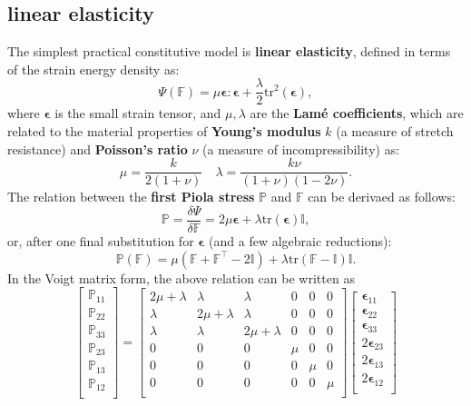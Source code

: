 \documentclass[11pt]{amsart}
\numberwithin{figure}{section}
\theoremstyle{plain}
\theoremstyle{definition}
\numberwithin{equation}{section}
\begin{document}
\subsection{linear elasticity}
The simplest practical constitutive model is \textbf{linear elasticity}, 
defined in terms of the strain energy density as: 
\[
  \Psi \left(\mathbb{F}\right) = 
  \mu \bm{\epsilon} : \bm{\epsilon} 
  + \frac{ \lambda }{ 2 } \text{tr} ^{2} \left(\bm{\epsilon}\right),
\] 
where $\bm{\epsilon}$ is the small strain tensor, 
and $\mu, \lambda$ are the \textbf{Lam\'e coefficients}, 
which are related to the material properties of  \textbf{Young's modulus} $k$ (a measure of stretch resistance) and \textbf{Poisson's ratio} $\nu$ (a measure of incompressibility) as:
\[
\mu = \frac{ k }{ 2 \left(1+\nu\right) } \quad 
\lambda = \frac{ k \nu }{ \left(1+\nu\right) \left(1 - 2\nu\right) } .
\] 
The relation between the  \textbf{first Piola stress} $\mathbb{P}$ and $\mathbb{F}$ can be derivaed as follows:
\[
  \mathbb{P} = \frac{ \delta \Psi }{ \delta \mathbb{F} }  = 
  2 \mu \bm{\epsilon} + \lambda \text{tr} \left(\bm{\epsilon}\right) \mathbb{I},
\] 
or, after one final substitution for $\bm{\epsilon}$ (and a few algebraic reductions):
\[
  \mathbb{P} \left(\mathbb{F}\right) = 
  \mu \left(\mathbb{F} + \mathbb{F}^{\top} - 2 \mathbb{I}\right) 
  + \lambda \text{tr} \left(\mathbb{F} - \mathbb{I}\right) \mathbb{I}.
\] 
In the Voigt matrix form, the above relation can be written as 
\[
\left[
\begin{array}{c}
\mathbb{P}_{11} \\
\mathbb{P}_{22} \\
\mathbb{P}_{33} \\
\mathbb{P}_{23} \\
\mathbb{P}_{13} \\
\mathbb{P}_{12} \\
\end{array}
\right] 
= 
\left[
\begin{array}{cccccc}
2 \mu + \lambda & \lambda & \lambda & 0 & 0 & 0 \\
\lambda & 2 \mu + \lambda & \lambda & 0 & 0 & 0 \\
\lambda & \lambda & 2 \mu + \lambda & 0 & 0 & 0 \\
0 & 0 & 0 & \mu & 0 & 0 \\
0 & 0 & 0 & 0 & \mu & 0 \\
0 & 0 & 0 & 0 & 0 & \mu \\
\end{array}
\right]
\left[
\begin{array}{c}
\bm{\epsilon}_{11} \\
\bm{\epsilon}_{22} \\
\bm{\epsilon}_{33} \\
2\bm{\epsilon}_{23} \\
2\bm{\epsilon}_{13} \\
2\bm{\epsilon}_{12} \\
\end{array}
\right] 
\] 
\end{document}
